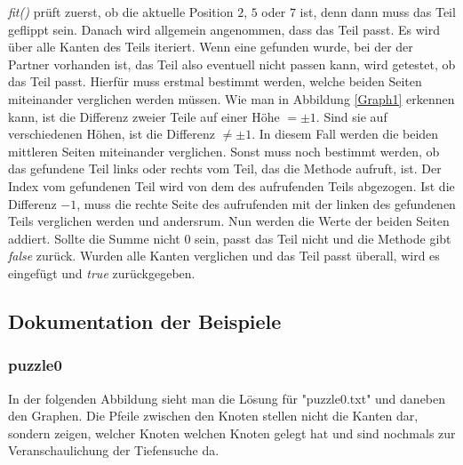 \documentclass[a4paper, 12pt]{scrartcl}
\begin{document}
\emph{fit()} prüft zuerst, ob die aktuelle Position $2$, $5$ oder $7$ ist, denn dann muss das Teil geflippt sein. Danach wird allgemein angenommen, dass das Teil passt. Es wird über alle Kanten des Teils iteriert. Wenn eine gefunden wurde, bei der der Partner vorhanden ist, das Teil also eventuell nicht passen kann, wird getestet, ob das Teil passt. Hierfür muss erstmal bestimmt werden, welche beiden Seiten miteinander verglichen werden müssen. Wie man in Abbildung \ref{Graph1} erkennen kann, ist die Differenz zweier Teile auf einer Höhe $=\pm 1$. Sind sie auf verschiedenen Höhen, ist die Differenz $\neq\pm 1$. In diesem Fall werden die beiden mittleren Seiten miteinander verglichen. Sonst muss noch bestimmt werden, ob das gefundene Teil links oder rechts vom Teil, das die Methode aufruft, ist. Der Index vom gefundenen Teil wird von dem des aufrufenden Teils abgezogen. Ist die Differenz $-1$, muss die rechte Seite des aufrufenden mit der linken des gefundenen Teils verglichen werden und andersrum. Nun werden die Werte der beiden Seiten addiert. Sollte die Summe nicht $0$ sein, passt das Teil nicht und die Methode gibt \emph{false} zurück. Wurden alle Kanten verglichen und das Teil passt überall, wird es eingefügt und \emph{true} zurückgegeben.

\subsection{Dokumentation der Beispiele}

\subsubsection{puzzle0}
In der folgenden Abbildung sieht man die Lösung für "puzzle0.txt" und daneben den Graphen. Die Pfeile zwischen den Knoten stellen nicht die Kanten dar, sondern zeigen, welcher Knoten welchen Knoten gelegt hat und sind nochmals zur Veranschaulichung der Tiefensuche da.
\end{document}
